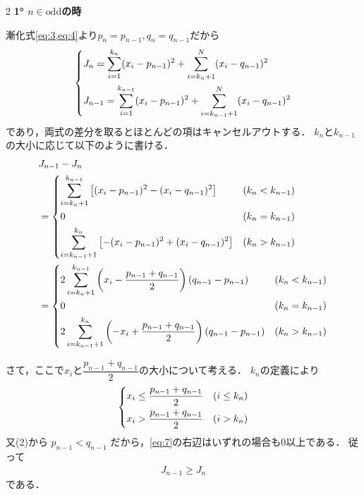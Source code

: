 \documentclass[../../main.tex]{subfiles}
\begin{document}
\begin{multicols}{2}
  \textbf{1° $n \in \text{odd}$の時}

  漸化式\cref{eq:3,eq:4}より$p_{n}=p_{n-1}, q_{n}=q_{n-1}$だから
  \begin{align}
    \begin{dcases}
      J_n      = \sum_{i=1}^{k_n}     (x_i-p_{n-1})^2 + \sum_{i=k_{n}+1}^{N}     (x_i-q_{n-1})^2 \\
      J_{n-1}  = \sum_{i=1}^{k_{n-1}} (x_i-p_{n-1})^2 + \sum_{i=k_{n-1}+1}^{N} (x_i-q_{n-1})^2
    \end{dcases}
  \end{align}
  であり，両式の差分を取るとほとんどの項はキャンセルアウトする．
  $k_n$と$k_{n-1}$の大小に応じて以下のように書ける．
  \begin{align}
    & J_{n-1} - J_{n}                                                                              \\
    & =
    \begin{dcases}
      \sum_{i=k_{n}+1}^{k_{n-1}} \left[ (x_i-p_{n-1})^2 - (x_i-q_{n-1})^2 \right]  & (k_n < k_{n-1} ) \\
      0                                                                            & (k_n = k_{n-1})  \\
      \sum_{i=k_{n-1}+1}^{k_{n}} \left[ -(x_i-p_{n-1})^2 + (x_i-q_{n-1})^2 \right] & (k_n > k_{n-1})  \\
    \end{dcases} \\
    & =
    \begin{dcases}
      2 \sum_{i=k_{n}+1}^{k_{n-1}} \left( x_i - \dfrac{p_{n-1}+q_{n-1}}{2} \right) (q_{n-1}-p_{n-1})  & (k_n < k_{n-1}) \\
      0                                                                                              & (k_n = k_{n-1}) \\
      2 \sum_{i=k_{n-1}+1}^{k_{n}} \left( -x_i + \dfrac{p_{n-1}+q_{n-1}}{2} \right) (q_{n-1}-p_{n-1}) & (k_n > k_{n-1}) \\
    \end{dcases}\label{eq:7}
  \end{align}

  さて，ここで$x_i$と$\dfrac{p_{n-1}+q_{n-1}}{2}$の大小について考える．
  $k_{n}$の定義により
  \begin{align}
    \begin{dcases}
      x_i \le \dfrac{p_{n-1}+q_{n-1}}{2} & (i \le k_{n}) \\
      x_i > \dfrac{p_{n-1}+q_{n-1}}{2}   & (i > k_{n})
    \end{dcases}
  \end{align}
  又(2)から $p_{n-1}<q_{n-1}$ だから，\cref{eq:7}の右辺はいずれの場合も$0$以上である．
  従って
  \begin{align}
    J_{n-1} \ge J_{n}
  \end{align}
  である．


\end{multicols}
\end{document}
